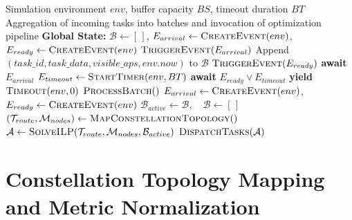 \begin{algorithm}[H]
\caption{Event-Driven Batch Ingestion and Orchestrator Lifecycle}
\label{alg:dynamic_batching}
\small
\begin{algorithmic}[1]
\Require Simulation environment $env$, buffer capacity $BS$, timeout duration $BT$
\Ensure Aggregation of incoming tasks into batches and invocation of optimization pipeline
\State \textbf{Global State:} $\mathcal{B} \gets [\,]$, $E_{arrival} \gets \Call{CreateEvent}{env}$, $E_{ready} \gets \Call{CreateEvent}{env}$
\Statex
{} 
        \State $\Call{TriggerEvent}{E_{arrival}}$ 
    \EndIf
    \State Append $(task\_id, task\_data, visible\_aps, env.now)$ to $\mathcal{B}$
        \State $\Call{TriggerEvent}{E_{ready}}$ 
    \EndIf
\EndProcedure
\Statex
{} 
    \Loop
            \State \textbf{await} $E_{arrival}$ 
        \EndIf
        \State $E_{timeout} \gets \Call{StartTimer}{env, BT}$ 
        \State \textbf{await} $E_{ready} \lor E_{timeout}$ 
            \State \textbf{yield} $\Call{Timeout}{env, 0}$ 
            \State $\Call{ProcessBatch}{}$
        \EndIf
        \State $E_{arrival} \gets \Call{CreateEvent}{env}$, \quad $E_{ready} \gets \Call{CreateEvent}{env}$ 
    \EndLoop
\EndProcedure
\Statex
{} 
    \State $\mathcal{B}_{active} \gets \mathcal{B}, \quad \mathcal{B} \gets [\,]$
    \State $(\mathcal{T}_{route}, \mathcal{M}_{nodes}) \gets \Call{MapConstellationTopology}{}$
    \State $\mathcal{A} \gets \Call{SolveILP}{\mathcal{T}_{route}, \mathcal{M}_{nodes}, \mathcal{B}_{active}}$
    \State $\Call{DispatchTasks}{\mathcal{A}}$
\EndProcedure
\end{algorithmic}
\end{algorithm}
\FloatBarrier

\section{Constellation Topology Mapping and Metric Normalization}
\label{sec:constellation_mapping}

